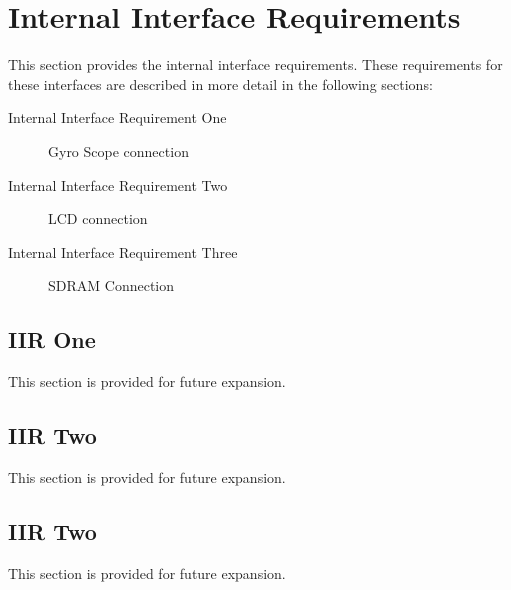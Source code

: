 \KNEADSECTIONNEWPAGE
\section{Internal Interface Requirements}
\label{lab:sec_InternalInterfaceRequirements}
% 


This section provides the internal interface requirements.
These requirements for these interfaces are described in more detail in the following sections:
\begin{description}
	\item[Internal Interface Requirement One] Gyro Scope connection%
	\item[Internal Interface Requirement Two] LCD connection%
	\item[Internal Interface Requirement Three] SDRAM Connection%
\end{description}


\KNEADSUBSECTIONNEWPAGE
\subsection{IIR One}
\label{loc:IIR_One}

This section is provided for future expansion.


\KNEADSUBSECTIONNEWPAGE
\subsection{IIR Two}
\label{loc:IIR_Two}

This section is provided for future expansion.


\KNEADSUBSECTIONNEWPAGE
\subsection{IIR Two}
\label{loc:IIR_Two}

This section is provided for future expansion.
